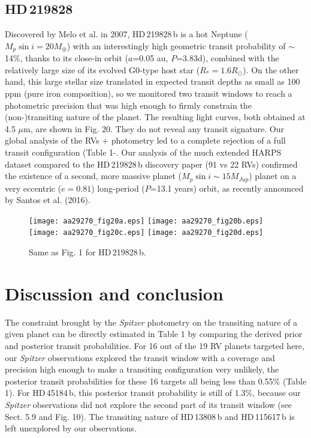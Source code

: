 \documentclass[traditabstract]{aa}
\begin{document}
\subsection{HD\,219828}

Discovered by Melo et al. in 2007, HD\,219828\,b is a hot Neptune ($M_p \sin i = 20 M_\oplus$) with an interestingly high geometric transit probability of $\sim$14\%, thanks to its close-in orbit ($a$=0.05 au, $P$=3.83d), combined with the relatively large size of its evolved G0-type host star ($R_\ast = 1.6 R_\odot$). On the other hand, this large stellar size translated in expected transit depths as small as 100 ppm (pure iron composition), so we monitored two transit windows to reach a photometric precision that was high enough to firmly constrain the (non-)transiting nature of the planet.  The resulting light curves, both obtained at 4.5 $\mu$m, are shown in Fig. 20. They do not reveal any transit signature. Our global analysis of the RVs + photometry led to a complete rejection of a full transit configuration (Table 1-. Our analysis of the much extended HARPS dataset compared to the HD\,219828\,b discovery paper (91 vs 22 RVs) confirmed the existence of a second, more massive planet ($M_p \sin i \sim 15  M_{Jup}$) planet on a very eccentric ($e=0.81$)  long-period ($P$=13.1 years) orbit, as recently announced by Santos et al. (2016). 

\begin{figure}
\label{fig:22}
\centering                     
\texttt{[image: aa29270\_fig20a.eps]}
\texttt{[image: aa29270\_fig20b.eps]}
\texttt{[image: aa29270\_fig20c.eps]}
\texttt{[image: aa29270\_fig20d.eps]}
\caption{Same as Fig. 1 for HD\,219828\,b. }
\end{figure} 

\section{Discussion and conclusion}

The constraint brought by the {\it Spitzer} photometry on the transiting nature of a given planet can be directly estimated in Table 1 by comparing the derived prior and posterior transit probabilities. For 16 out of the 19 RV planets targeted here, our {\it Spitzer} observations explored the transit window with a coverage and precision high enough to make a transiting configuration very unlikely, the posterior transit probabilities for these 16 targets all being less than 0.55\% (Table 1). For HD\,45184\,b, this posterior transit probability is still of 1.3\%, because our {\it Spitzer} observations did not explore the second part of its transit window (see Sect. 5.9 and Fig. 10). The transiting nature of HD\,13808\,b and  HD\,115617\,b is left unexplored by our observations. 
\end{document}
